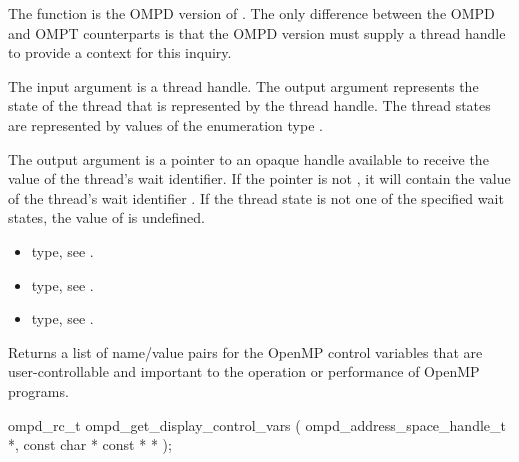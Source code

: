 \descr
The function  is the  OMPD version of
. 
The only difference between the OMPD and OMPT counterparts
is that the OMPD version must supply a thread handle to provide
a context for this inquiry.

\argdesc


The input argument  is a thread handle. The output argument
 represents the state of the thread that is represented by the thread handle.
The thread states are represented by values of the enumeration type
.

The output argument  is a pointer to an opaque handle available to receive the value 
of the thread's wait identifier. If the  pointer is not , it will contain
the value of the thread's wait identifier . If the thread state is not one of the 
specified wait states, the value of  is undefined.


\crossreferences
\begin{itemize}
	\item {} type, see .
	\item {} type, see .
	\item {} type, see .
\end{itemize}




\label{ompd:ompd_get_display_control_vars}
\label{sec:ompd_get_display_control_vars}
\summary
Returns a list of name/value pairs for the OpenMP control variables
that are user-controllable and important to the operation or
performance of OpenMP programs.
\format
\cspecificstart
\begin{boxedcode}
ompd\_rc\_t ompd\_get\_display\_control\_vars (
  ompd\_address\_space\_handle\_t *, 
  const char * const *  *
);
\end{boxedcode}
\cspecificend

